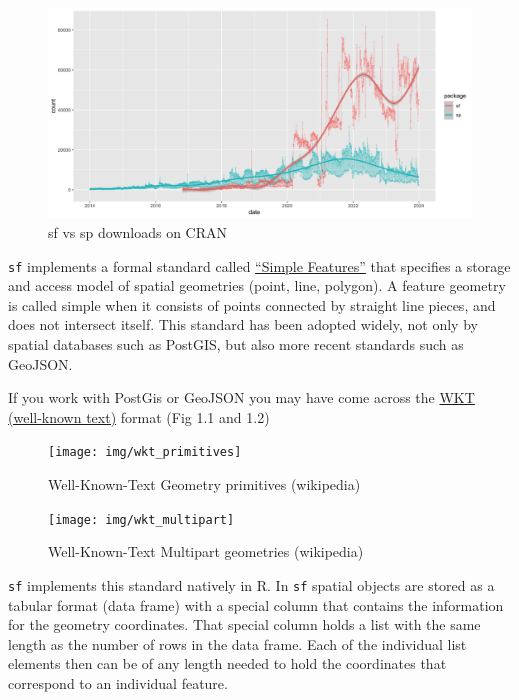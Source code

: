 \documentclass[
]{book}
\begin{document}
\begin{figure}
\includegraphics[width=1\linewidth]{img/spsf_downloads} \caption{sf vs sp downloads on CRAN}\label{fig:spsf-dl}
\end{figure}

\texttt{sf} implements a formal standard called \href{https://en.wikipedia.org/wiki/Simple_Features}{``Simple Features''} that specifies a storage and access model of spatial geometries (point, line, polygon). A feature geometry is called simple when it consists of points connected by straight line pieces, and does not intersect itself. This standard has been adopted widely, not only by spatial databases such as PostGIS, but also more recent standards such as GeoJSON.

If you work with PostGis or GeoJSON you may have come across the \href{https://en.wikipedia.org/wiki/Well-known_text}{WKT (well-known text)} format (Fig 1.1 and 1.2)

\begin{figure}
\texttt{[image: img/wkt\_primitives]} \caption{Well-Known-Text Geometry primitives  (wikipedia)}\label{fig:wkt-primitives}
\end{figure}

\begin{figure}
\texttt{[image: img/wkt\_multipart]} \caption{Well-Known-Text Multipart geometries (wikipedia)}\label{fig:wkt-multipart}
\end{figure}

\texttt{sf} implements this standard natively in R. In \texttt{sf} spatial objects are stored as a tabular format (data frame) with a special column that contains the information for the geometry coordinates. That special column holds a list with the same length as the number of rows in the data frame. Each of the individual list elements then can be of any length needed to hold the coordinates that correspond to an individual feature.
\end{document}
